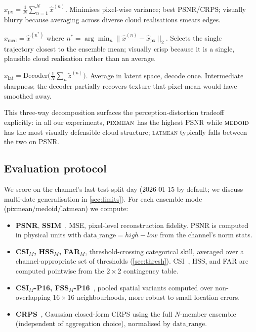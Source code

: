 \documentclass[11pt,a4paper]{article}
\begin{document}
\begin{description}[leftmargin=*]
\item[\textsc{pixmean}.] $\hat x_{\text{px}} = \tfrac{1}{N}\sum_{n=1}^N \hat
  x^{(n)}$. Minimises pixel-wise variance; best PSNR/CRPS; visually blurry
  because averaging across diverse cloud realisations smears edges.
\item[\textsc{medoid}.] $\hat x_{\text{med}} = \hat x^{(n^*)}$ where
  $n^* = \arg\min_n \|\hat x^{(n)} - \hat x_{\text{px}}\|_2$. Selects the
  single trajectory closest to the ensemble mean; visually crisp because
  it is a single, plausible cloud realisation rather than an average.
\item[\textsc{latmean}.] $\hat x_{\text{lat}} = \mathrm{Decoder}\!\bigl(
  \tfrac{1}{N}\sum_n \tilde z^{(n)}\bigr)$. Average in latent space, decode
  once. Intermediate sharpness; the decoder partially recovers texture
  that pixel-mean would have smoothed away.
\end{description}

This three-way decomposition surfaces the
perception-distortion tradeoff~\citep{blau2018perception} explicitly: in
all our experiments, $\textsc{pixmean}$ has the highest PSNR while
$\textsc{medoid}$ has the most visually defensible cloud structure;
\textsc{latmean} typically falls between the two on PSNR.

\subsection{Evaluation protocol}
\label{sec:metrics}

We score on the channel's last test-split day (2026-01-15 by default; we
discuss multi-date generalisation in \cref{sec:limits}). For each
ensemble mode (pixmean/medoid/latmean) we compute:

\begin{itemize}[leftmargin=*]
\item \textbf{PSNR}, \textbf{SSIM}~\citep{wang2004ssim}, MSE, pixel-level
      reconstruction fidelity. PSNR is computed in physical units with
      $\mathrm{data\_range} = \mathit{high}-\mathit{low}$ from the channel's
      norm stats.
\item \textbf{CSI$_M$, HSS$_M$, FAR$_M$}, threshold-crossing categorical
      skill, averaged over a channel-appropriate set of thresholds
      (\cref{sec:thresh}). CSI~\citep{schaefer1990csi}, HSS, and FAR are
      computed pointwise from the $2\times2$ contingency table.
\item \textbf{CSI$_M$-P16, FSS$_M$-P16}~\citep{roberts2008fss}, pooled
      spatial variants computed over non-overlapping $16\times16$
      neighbourhoods, more robust to small location errors.
\item \textbf{CRPS}~\citep{matheson1976crps}, Gaussian closed-form CRPS
      using the full $N$-member ensemble (independent of aggregation
      choice), normalised by $\mathrm{data\_range}$.
\end{itemize}
\end{document}
